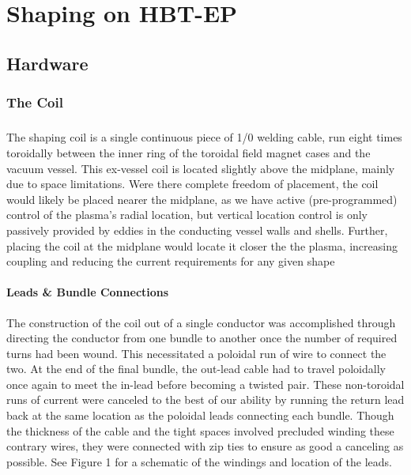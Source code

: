 \chapter{Shaping on HBT-EP}
\section{Hardware}
\subsection{The Coil}
\paragraph{} The shaping coil is a single continuous piece of 1/0 welding cable, run eight times toroidally between the inner ring of the toroidal field magnet cases and the vacuum vessel.  This ex-vessel coil is located slightly above the midplane, mainly due to space limitations.  Were there complete freedom of placement, the coil would likely be placed nearer the midplane, as we have active (pre-programmed) control of the plasma's radial location, but vertical location control is only passively provided by eddies in the conducting vessel walls and shells.  Further, placing the coil at the midplane would locate it closer the the plasma, increasing coupling and reducing the current requirements for any given shape
\subsubsection{Leads \& Bundle Connections} 
The construction of the coil out of a single conductor was accomplished through directing the conductor from one bundle to another once the number of required turns had been wound.  This necessitated a poloidal run of wire to connect the two.  At the end of the final bundle, the out-lead cable had to travel poloidally once again to meet the in-lead before becoming a twisted pair.  These non-toroidal runs of current were canceled to the best of our ability by running the return lead back at the same location as the poloidal leads connecting each bundle.  Though the thickness of the cable and the tight spaces involved precluded winding these contrary wires, they were connected with zip ties to ensure as good a canceling as possible.  See Figure 1 for a schematic of the windings and location of the leads.\\

